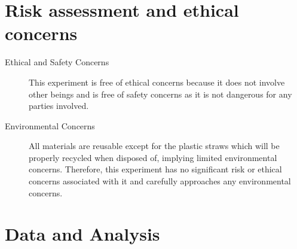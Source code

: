 \documentclass[11pt]{article}
\begin{document}
\section{Risk assessment and ethical concerns}
\begin{description}
    \item[Ethical and Safety Concerns] This experiment is free of ethical concerns because it does not involve other beings and is free of safety concerns as it is not dangerous for any parties involved.
    \item[Environmental Concerns] All materials are reusable except for the plastic straws which will be properly recycled when disposed of, implying limited environmental concerns. Therefore, this experiment has no significant risk or ethical concerns associated with it and carefully approaches any environmental concerns.
\end{description}

\section{Data and Analysis}
\end{document}
